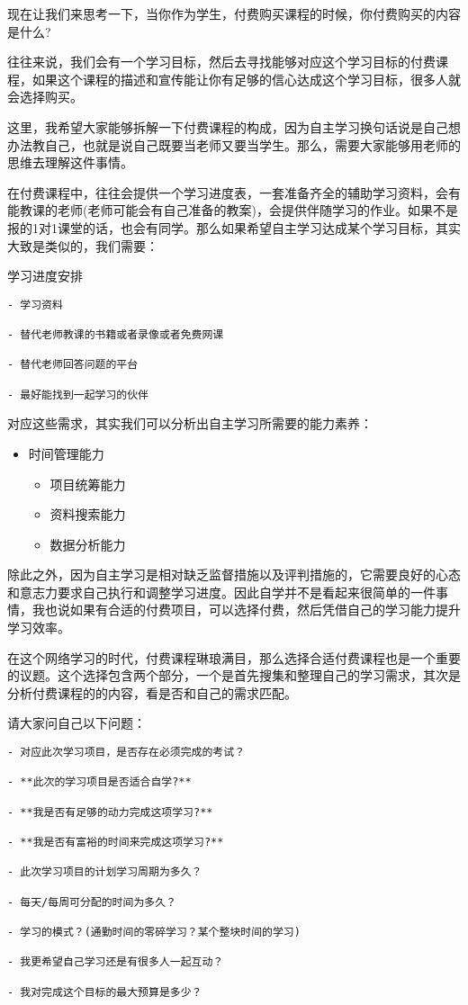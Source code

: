 \documentclass[
]{book}
\begin{document}
现在让我们来思考一下，当你作为学生，付费购买课程的时候，你付费购买的内容是什么?

往往来说，我们会有一个学习目标，然后去寻找能够对应这个学习目标的付费课程，如果这个课程的描述和宣传能让你有足够的信心达成这个学习目标，很多人就会选择购买。

这里，我希望大家能够拆解一下付费课程的构成，因为自主学习换句话说是自己想办法教自己，也就是说自己既要当老师又要当学生。那么，需要大家能够用老师的思维去理解这件事情。

在付费课程中，往往会提供一个学习进度表，一套准备齐全的辅助学习资料，会有能教课的老师(老师可能会有自己准备的教案)，会提供伴随学习的作业。如果不是报的1对1课堂的话，也会有同学。那么如果希望自主学习达成某个学习目标，其实大致是类似的，我们需要：

学习进度安排

\begin{verbatim}
- 学习资料

- 替代老师教课的书籍或者录像或者免费网课

- 替代老师回答问题的平台

- 最好能找到一起学习的伙伴
\end{verbatim}

对应这些需求，其实我们可以分析出自主学习所需要的能力素养：

\begin{itemize}
\item
  时间管理能力

  \begin{itemize}
  \item
    项目统筹能力
  \item
    资料搜索能力
  \item
    数据分析能力
  \end{itemize}
\end{itemize}

除此之外，因为自主学习是相对缺乏监督措施以及评判措施的，它需要良好的心态和意志力要求自己执行和调整学习进度。因此自学并不是看起来很简单的一件事情，我也说如果有合适的付费项目，可以选择付费，然后凭借自己的学习能力提升学习效率。

在这个网络学习的时代，付费课程琳琅满目，那么选择合适付费课程也是一个重要的议题。这个选择包含两个部分，一个是首先搜集和整理自己的学习需求，其次是分析付费课程的的内容，看是否和自己的需求匹配。

请大家问自己以下问题：

\begin{verbatim}
- 对应此次学习项目，是否存在必须完成的考试？

- **此次的学习项目是否适合自学?**

- **我是否有足够的动力完成这项学习?**

- **我是否有富裕的时间来完成这项学习?**

- 此次学习项目的计划学习周期为多久？

- 每天/每周可分配的时间为多久？

- 学习的模式？(通勤时间的零碎学习？某个整块时间的学习)

- 我更希望自己学习还是有很多人一起互动？

- 我对完成这个目标的最大预算是多少？
\end{verbatim}
\end{document}
